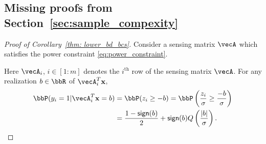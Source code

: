 \subsection{Missing proofs from Section~\ref{sec:sample_compexity}}\label{proof:sec:lower_bd}
\begin{proof}[Proof of Corollary~\ref{thm: lower_bd_bcs}]
Consider a sensing matrix $\vecA$ which satisfies the power constraint \eqref{eq:power_constraint}. 

Here $\vecA_i$, $i\in [1:m]$ denotes the $i^{\text{th}}$ row of the sensing matrix $\vecA$.
For any realization $b\in \bbR$ of $\vecA_i^T\bx$, 
\begin{align*}
\bbP(y_i = 1|\vecA_i^T\bx = b) &= \bbP(z_i\geq -b)= \bbP\inp{\frac{z_i}{\sigma}\geq \frac{-b}{\sigma}}\\
& = \frac{1- \sign{b}}{2} + \sign{b}Q\inp{\frac{|b|}{\sigma}}.
\end{align*} 


\end{proof}

